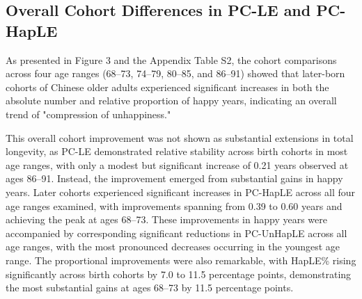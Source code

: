\documentclass[12pt, a4paper]{article}
\begin{document}
\subsection{Overall Cohort Differences in PC-LE and PC-HapLE}

As presented in Figure 3 and the Appendix Table S2, the cohort comparisons across four age ranges (68–73, 74–79, 80–85, and 86–91) showed that later-born cohorts of Chinese older adults experienced significant increases in both the absolute number and relative proportion of happy years, indicating an overall trend of "compression of unhappiness."

This overall cohort improvement was not shown as substantial extensions in total longevity, as PC-LE demonstrated relative stability across birth cohorts in most age ranges, with only a modest but significant increase of 0.21 years observed at ages 86–91. Instead, the improvement emerged from substantial gains in happy years. Later cohorts experienced significant increases in PC-HapLE across all four age ranges examined, with improvements spanning from 0.39 to 0.60 years and achieving the peak at ages 68–73. These improvements in happy years were accompanied by corresponding significant reductions in PC-UnHapLE across all age ranges, with the most pronounced decreases occurring in the youngest age range. The proportional improvements were also remarkable, with HapLE\% rising significantly across birth cohorts by 7.0 to 11.5 percentage points, demonstrating the most substantial gains at ages 68–73 by 11.5 percentage points.
\end{document}
